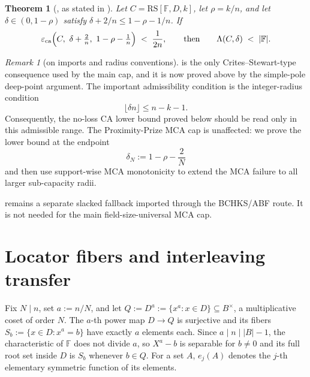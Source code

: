 \documentclass[11pt]{article}
\newtheorem{theorem}{Theorem}[section]
\theoremstyle{definition}
\theoremstyle{remark}
\newtheorem{remark}[remark]{Remark}
\newcommand{\F}{\mathbb{F}}
\newcommand{\B}{B}
\newcommand{\RS}{\mathrm{RS}}
\newcommand{\eca}{\varepsilon_{\mathrm{ca}}}
\newcommand{\Lst}{\Lambda}
\begin{document}
\begin{theorem}[{\cite[Thm.~1.9]{BCHKS25}}, as stated in {\cite[Thm.~5.2]{ABF26}}]\label{thm:B}
Let $C=\RS[\F,D,k]$, let $\rho=k/n$, and let $\delta\in(0,1-\rho)$ satisfy $\delta+2/n\le 1-\rho-1/n$. If
\[
\eca\Bigl(C,\ \delta+\tfrac2n,\ 1-\rho-\tfrac1n\Bigr)\;<\;\frac1{2n},
\qquad\text{then}\qquad
\Lst(C,\delta)\;<\;|\F| .
\]
\end{theorem}

\begin{remark}[on imports and radius conventions]\label{rem:import}
 is the only Crites--Stewart-type consequence used by the main cap, and it is now proved above by the simple-pole deep-point argument.  The important admissibility condition is the integer-radius condition
\[
        \lfloor \delta n\rfloor \le n-k-1 .
\]
Consequently, the no-loss CA lower bound proved below should be read only in this admissible range. The Proximity-Prize MCA cap is unaffected: we prove the lower bound at the endpoint
\[
        \delta_N:=1-\rho-\frac2N
\]
and then use support-wise MCA monotonicity to extend the MCA failure to all larger sub-capacity radii.

 remains a separate slacked fallback imported through the BCHKS/ABF route. It is not needed for the main field-size-universal MCA cap.
\end{remark}

\section{Locator fibers and interleaving transfer}\label{sec:fiber}

Fix $N\mid n$, set $a:=n/N$, and let $Q:=D^{a}:=\{x^a:x\in D\}\subseteq\B^\times$, a multiplicative coset of order $N$. The $a$-th power map $D\to Q$ is surjective and its fibers $S_b:=\{x\in D:x^a=b\}$ have exactly $a$ elements each. Since $a\mid n\mid|\B|-1$, the characteristic of $\F$ does not divide $a$, so $X^a-b$ is separable for $b\ne0$ and its full root set inside $D$ is $S_b$ whenever $b\in Q$. For a set $A$, $e_j(A)$ denotes the $j$-th elementary symmetric function of its elements.
\end{document}
